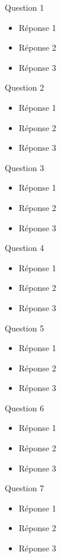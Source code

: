 \documentclass[asi, sansVersion]{picInsa}
\begin{document}
			Question 1
			\begin{itemize}
				\item Réponse 1
				\item Réponse 2
				\item Réponse 3
			\end{itemize}
			\vspace{8px}

			Question 2
			\begin{itemize}
				\item Réponse 1
				\item Réponse 2
				\item Réponse 3
			\end{itemize}
			\vspace{8px}

			Question 3
			\begin{itemize}
				\item Réponse 1
				\item Réponse 2
				\item Réponse 3
			\end{itemize}
			\vspace{8px}
			
			Question 4
			\begin{itemize}
				\item Réponse 1
				\item Réponse 2
				\item Réponse 3
			\end{itemize}
			\vspace{8px}
			
			Question 5
			\begin{itemize}
				\item Réponse 1
				\item Réponse 2
				\item Réponse 3
			\end{itemize}
			\vspace{8px}
			
			Question 6
			\begin{itemize}
				\item Réponse 1
				\item Réponse 2
				\item Réponse 3
			\end{itemize}
			\vspace{8px}
			
			Question 7
			\begin{itemize}
				\item Réponse 1
				\item Réponse 2
				\item Réponse 3
			\end{itemize}
			\vspace{8px}
			
\end{document}
